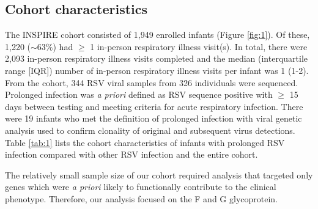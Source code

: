 \documentclass{article} %
\begin{document}
\subsection{Cohort characteristics}
The INSPIRE cohort consisted of 1,949 enrolled infants 
(Figure \ref{fig:1}).
Of these, 1,220 ($\sim 63\%$) had $\ge$ 1 in-person respiratory illness visit(s). 
In total, there were 2,093 in-person respiratory illness visits completed and the median (interquartile range [IQR]) number of in-person respiratory illness visits per infant was 1 (1-2).
From the cohort, 344 RSV viral samples from 326 individuals were sequenced.
Prolonged infection was \textit{a priori} defined as RSV sequence positive with $\ge$ 15 days between testing and meeting criteria for acute respiratory infection.
There were 19 infants who met the definition of prolonged infection with viral genetic analysis used to confirm clonality of original and subsequent virus detections. 
Table \ref{tab:1} lists the cohort characteristics of infants with prolonged RSV infection compared with other RSV infection and the entire cohort. 

The relatively small sample size of our cohort required analysis that targeted only genes which were \textit{a priori} likely to functionally contribute to the clinical phenotype. 
Therefore, our analysis focused on the F and G glycoprotein. 
\end{document}
